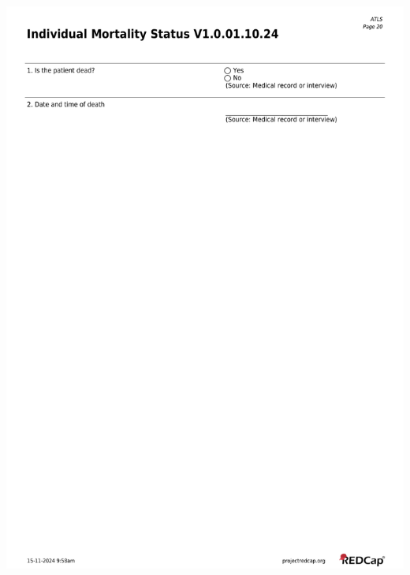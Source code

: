 \documentclass[
]{scrartcl}
\begin{document}
\includegraphics{../case-record-form/instrument-pdfs/pages/all-instruments-20.pdf}
\end{document}

